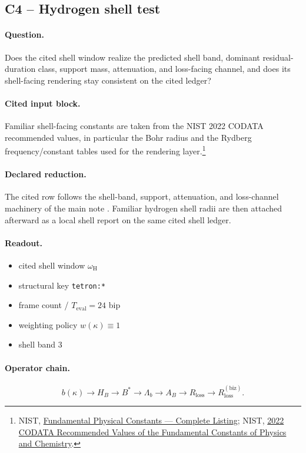 \subsection{C4 -- Hydrogen shell test}\label{suppc:c4-hydrogen-shell}
\paragraph{Question.} Does the cited shell window realize the predicted shell band, dominant residual-duration class, support mass, attenuation, and loss-facing channel, and does its shell-facing rendering stay consistent on the cited ledger?

\paragraph{Cited input block.} Familiar shell-facing constants are taken from the NIST 2022 CODATA recommended values, in particular the Bohr radius and the Rydberg frequency/constant tables used for the rendering layer.\footnote{NIST, \href{https://physics.nist.gov/cuu/Constants/Table/allascii.txt}{Fundamental Physical Constants --- Complete Listing}; NIST, \href{https://physics.nist.gov/cuu/pdf/wallet_2022.pdf}{2022 CODATA Recommended Values of the Fundamental Constants of Physics and Chemistry}.}

\paragraph{Declared reduction.} The cited row follows the shell-band, support, attenuation, and loss-channel machinery of the main note \cite{aod43_main_2026}. Familiar hydrogen shell radii are then attached afterward as a local shell report on the same cited shell ledger.

\paragraph{Readout.}
\begin{itemize}
\item cited shell window $\omega_{\mathrm{H}}$
\item structural key \texttt{tetron:*}
\item frame count / $T_{\mathrm{eval}}=24$ bip
\item weighting policy $w(\kappa)\equiv 1$
\item shell band $3$
\end{itemize}

\paragraph{Operator chain.}
\[
b(\kappa)\to H_B\to B^*\to \Lambda_b\to A_B\to R_{\mathrm{loss}}\to R_{\mathrm{loss}}^{(\mathrm{biz})}.
\]

